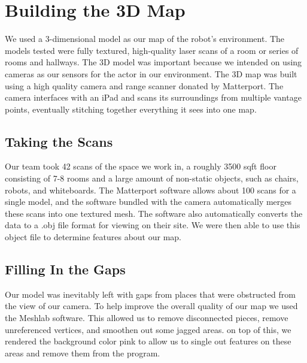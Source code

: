 \documentclass[a4paper,11pt]{article}
\begin{document}


  \section{Building the 3D Map}
  We used a 3-dimensional model as our map of the robot's environment. The models tested were fully textured, high-quality laser scans of a room or series of rooms and hallways. The 3D model was important because we intended on using cameras as our sensors for the actor in our environment. The 3D map was built using a high quality camera and range scanner donated by Matterport. The camera interfaces with an iPad and scans its surroundings from multiple vantage points, eventually stitching together everything it sees into one map. %
  
  \subsection{Taking the Scans}
 Our team took 42 scans of the space we work in, a roughly 3500 sqft floor consisting of 7-8 rooms and a large amount of non-static objects, such as chairs, robots, and whiteboards. The Matterport software allows about 100 scans for a single model, and the software bundled with the camera automatically merges these scans into one textured mesh. The software also automatically converts the data to a .obj file format for viewing on their site. We were then able to use this object file to determine features about our map.

  \subsection{Filling In the Gaps}
  Our model was inevitably left with gaps from places that were obstructed from the view of our camera. To help improve the overall quality of our map we used the Meshlab software. This allowed us to remove disconnected pieces, remove unreferenced vertices, and smoothen out some jagged areas. on top of this, we rendered the background color pink to allow us to single out features on these areas and remove them from the program.
  
\end{document}
